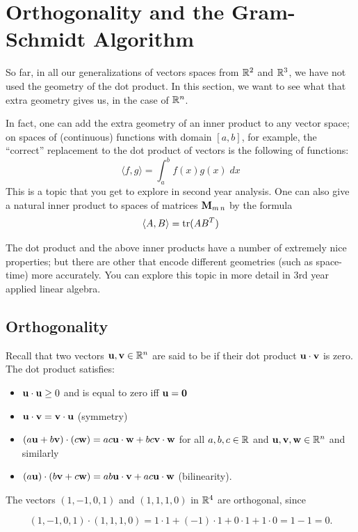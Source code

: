 \chapter{Orthogonality %
and the Gram-Schmidt Algorithm}
\label{chapter:orthog}


So far, in all our generalizations of vectors spaces from $\mathbb{R}^2$ and
$\mathbb{R}^3$, we have not used the geometry of the dot product.  In this
section, we want to see what that extra geometry gives us, in 
the case of $\mathbb{R}^n$.  

In fact, one can add the extra geometry of
an inner product to any vector space; on spaces of (continuous) functions with
domain $[a,b]$, for example, the ``correct'' replacement to the
dot product of vectors is the following  of functions:
$$
\langle f, g \rangle = \int_a^b f(x)g(x)\;dx
$$
This is a topic that you get to explore in second year analysis. One can also give a natural inner product  to spaces of matrices $\mathbf{M}_{m\, n}$ by the formula 
$$
\langle A, B \rangle = \operatorname{tr} (AB^T)
$$

The dot product and the above inner products have a number of 
extremely nice properties; but there are other 
that encode different geometries (such as space-time) more accurately.
You can explore this topic in more detail in 3rd year applied linear
algebra.



\section{Orthogonality}

Recall that two vectors $\mathbf{u}, \mathbf{v} \in \mathbb{R}^n$ are said to be  if their
dot product $\mathbf{u} \cdot \mathbf{v}$ is zero.  The dot product satisfies:
\begin{itemize}
\item $\mathbf{u} \cdot \mathbf{u} \geq 0$ and is equal to zero iff $\mathbf{u} = \mathbf{0}$
\item $\mathbf{u} \cdot \mathbf{v} = \mathbf{v} \cdot \mathbf{u}$ (symmetry)
\item $(a\mathbf{u} + b\mathbf{v})\cdot(c\mathbf{w}) = ac \mathbf{u} \cdot \mathbf{w} + bc \mathbf{v} \cdot \mathbf{w}$
for all $a,b,c\in\mathbb{R}$ and $\mathbf{u},\mathbf{v},\mathbf{w} \in \mathbb{R}^n$  and similarly
\item $(a\mathbf{u}) \cdot (b\mathbf{v} + c\mathbf{w}) = ab\mathbf{u} \cdot \mathbf{v} + ac \mathbf{u} \cdot \mathbf{w}$
(bilinearity).
\end{itemize}
\begin{myexample} The vectors $(1,-1,0,1)$ and $(1,1,1,0)$ in $\mathbb{R}^4$ are orthogonal, since 

$$(1,-1,0,1)\cdot(1,1,1,0)=1\cdot 1 + (-1) \cdot 1 + 0\cdot 1 + 1 \cdot 0=1-1=0.$$

\end{myexample}

